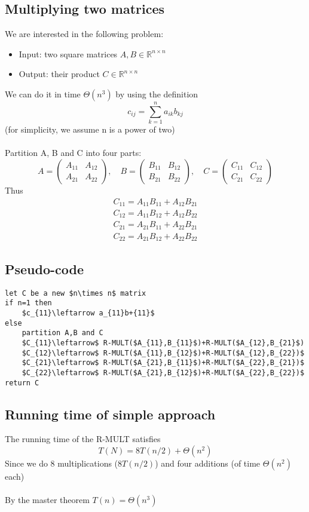 \documentclass{article}[18pt]
\begin{document}
\subsection{Multiplying two matrices}
We are interested in the following problem:
\begin{itemize}
	\item Input: two square matrices $A,B \in \mathbb{R}^{n\times n}$
	\item Output: their product $C\in \mathbb{R}^{n\times n}$
\end{itemize}
We can do it in time $\Theta(n^3)$ by using the definition
\[
c_{i j}=\sum_{k=1}^{n} a_{i k} b_{k j}
\]
(for simplicity, we assume n is a power of two)\\
\\
Partition A, B and C into four parts:
\[
A=\left(\begin{array}{ll}{A_{11}} & {A_{12}} \\ {A_{21}} & {A_{22}}\end{array}\right), \quad B=\left(\begin{array}{ll}{B_{11}} & {B_{12}} \\ {B_{21}} & {B_{22}}\end{array}\right), \quad C=\left(\begin{array}{ll}{C_{11}} & {C_{12}} \\ {C_{21}} & {C_{22}}\end{array}\right)
\]
Thus
\[
\begin{array}{l}{C_{11}=A_{11} B_{11}+A_{12} B_{21}} \\ {C_{12}=A_{11} B_{12}+A_{12} B_{22}} \\ {C_{21}=A_{21} B_{11}+A_{22} B_{21}} \\ {C_{22}=A_{21} B_{12}+A_{22} B_{22}}\end{array}
\]
\newpage
\subsection{Pseudo-code}
\begin{lstlisting}[caption=R-MULT({A, B})]
let C be a new $n\times n$ matrix
if n=1 then
	$c_{11}\leftarrow a_{11}b+{11}$
else
	partition A,B and C
	$C_{11}\leftarrow$ R-MULT($A_{11},B_{11}$)+R-MULT($A_{12},B_{21}$)
	$C_{12}\leftarrow$ R-MULT($A_{11},B_{12}$)+R-MULT($A_{12},B_{22})$
	$C_{21}\leftarrow$ R-MULT($A_{21},B_{11}$)+R-MULT($A_{22},B_{21})$
	$C_{22}\leftarrow$ R-MULT($A_{21},B_{12}$)+R-MULT($A_{22},B_{22})$
return C
\end{lstlisting}
\subsection{Running time of simple approach}
The running time of the R-MULT satisfies
$$T(N)=8T(n/2)+\Theta(n^2)$$
Since we do 8 multiplications ($8T(n/2)$) and four additions (of time $\Theta(n^2)$ each)\\
\\
By the master theorem $T(n)=\Theta(n^3)$
\end{document}
